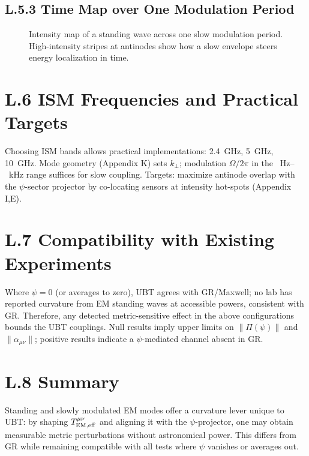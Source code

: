 \documentclass[12pt]{article}
\begin{document}
\subsection*{L.5.3 Time Map over One Modulation Period}
\begin{figure}[h!]
\centering
{}
\caption{Intensity map of a standing wave across one slow modulation period. High-intensity stripes at antinodes show how a slow envelope steers energy localization in time.}
\label{fig:Ltime}
\end{figure}

\section*{L.6 ISM Frequencies and Practical Targets}
Choosing ISM bands allows practical implementations: \SI{2.4}{GHz}, \SI{5}{GHz}, \SI{10}{GHz}.
Mode geometry (Appendix K) sets $k_\perp$; modulation $\Omega/2\pi$ in the \SI{}{\Hz}--\SI{}{\kilo\Hz} range suffices for slow coupling.
Targets: maximize antinode overlap with the $\psi$-sector projector by co-locating sensors at intensity hot-spots (Appendix I,E).

\section*{L.7 Compatibility with Existing Experiments}
Where $\psi=0$ (or averages to zero), UBT agrees with GR/Maxwell; no lab has reported curvature from EM standing waves at accessible powers, consistent with GR.
Therefore, any detected metric-sensitive effect in the above configurations bounds the UBT couplings.
Null results imply upper limits on $\|\Pi(\psi)\|$ and $\|\alpha_{\mu\nu}\|$; positive results indicate a $\psi$-mediated channel absent in GR.

\section*{L.8 Summary}
Standing and slowly modulated EM modes offer a curvature lever unique to UBT: by shaping $T^{\mu\nu}_{\rm EM,eff}$ and aligning it with the $\psi$-projector, one may obtain measurable metric perturbations without astronomical power.
This differs from GR while remaining compatible with all tests where $\psi$ vanishes or averages out.
\end{document}
